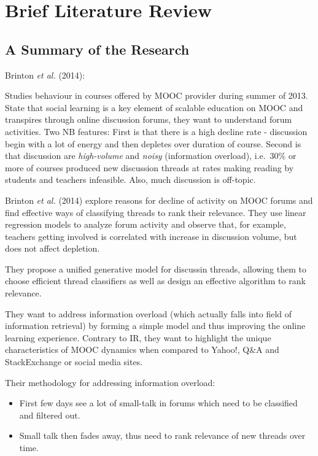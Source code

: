 \documentclass[11pt,preprint, authoryear]{article}
\numberwithin{equation}{section}
\numberwithin{figure}{section}
\numberwithin{table}{section}
\begin{document}
\newpage

\section{\texorpdfstring{Brief Literature Review
\label{Lit}}{Brief Literature Review }}\label{brief-literature-review}

\subsection{A Summary of the Research}\label{a-summary-of-the-research}

Brinton \emph{et al.} (2014):

Studies behaviour in courses offered by MOOC provider during summer of
2013. State that social learning is a key element of scalable education
on MOOC and transpires through online discussion forums, they want to
understand forum activities. Two NB features: First is that there is a
high decline rate - discussion begin with a lot of energy and then
depletes over duration of course. Second is that discussion are
\emph{high-volume} and \emph{noisy} (information overload), i.e.~30\% or
more of courses produced new discussion threads at rates making reading
by students and teachers infeasible. Also, much discussion is off-topic.

Brinton \emph{et al.} (2014) explore reasons for decline of activity on
MOOC forums and find effective ways of classifying threads to rank their
relevance. They use linear regression models to analyze forum activity
and observe that, for example, teachers getting involved is correlated
with increase in discussion volume, but does not affect depletion.

They propose a unified generative model for discussin threads, allowing
them to choose efficient thread classifiers as well as design an
effective algorithm to rank relevance.

They want to address information overload (which actually falls into
field of information retrieval) by forming a simple model and thus
improving the online learning experience. Contrary to IR, they want to
highlight the unique characteristics of MOOC dynamics when compared to
Yahoo!, Q\&A and StackExchange or social media sites.

Their methodology for addressing information overload:

\begin{itemize}
\item
  First few days see a lot of small-talk in forums which need to be
  classified and filtered out.
\item
  Small talk then fades away, thus need to rank relevance of new threads
  over time.
\end{itemize}
\end{document}
